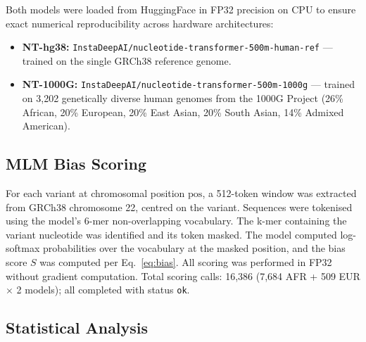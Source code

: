 \documentclass[conference]{IEEEtran}
\begin{document}
Both models were loaded from HuggingFace in FP32 precision on CPU
to ensure exact numerical reproducibility across hardware architectures:
\begin{itemize}
  \item \textbf{NT-hg38:} \texttt{InstaDeepAI/nucleotide-transformer-500m-human-ref} ---
        trained on the single GRCh38 reference genome.
  \item \textbf{NT-1000G:} \texttt{InstaDeepAI/nucleotide-transformer-500m-1000g} ---
        trained on 3{,}202 genetically diverse human genomes from the 1000G
        Project (26\% African, 20\% European, 20\% East Asian, 20\% South Asian,
        14\% Admixed American).
\end{itemize}

\subsection{MLM Bias Scoring}

For each variant at chromosomal position $\text{pos}$, a 512-token window was
extracted from GRCh38 chromosome 22, centred on the variant. Sequences were
tokenised using the model's 6-mer non-overlapping vocabulary. The k-mer
containing the variant nucleotide was identified and its token masked. The model
computed log-softmax probabilities over the vocabulary at the masked position,
and the bias score $S$ was computed per Eq.~\eqref{eq:bias}. All scoring was
performed in FP32 without gradient computation. Total scoring calls: 16{,}386
(7{,}684 AFR + 509 EUR $\times$ 2 models); all completed with status \texttt{ok}.

\subsection{Statistical Analysis}
\end{document}
